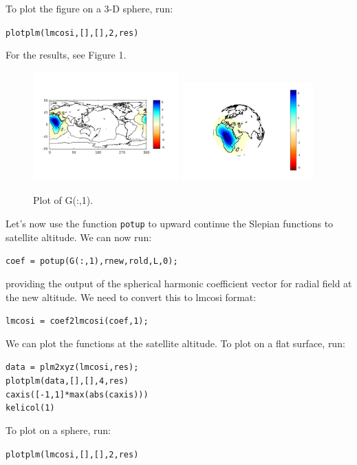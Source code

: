 \documentclass[11pt]{article}
\begin{document}
To plot the figure on a 3-D sphere, run:

\verb+plotplm(lmcosi,[],[],2,res)+

For the results, see Figure 1.
\begin{figure}[H]
  \includegraphics[width=0.5\textwidth]{figures/G(:,1)flatml.png}
  \includegraphics[width=0.45\textwidth]{figures/G(:,1)ml.png}
  \caption{Plot of G(:,1).}
\label{G(:,1)}
\end{figure}
Let's now use the function \verb+potup+ to upward continue the Slepian functions to satellite altitude.  We can now run:

\verb+coef = potup(G(:,1),rnew,rold,L,0);+

providing the output of the spherical harmonic coefficient vector for radial field at the new altitude.  We need to convert this to lmcosi format:

\verb+lmcosi = coef2lmcosi(coef,1);+

We can plot the functions at the satellite altitude.  To plot on a flat surface, run:

\verb+data = plm2xyz(lmcosi,res);+\\
\verb+plotplm(data,[],[],4,res)+\\
\verb+caxis([-1,1]*max(abs(caxis)))+\\
\verb+kelicol(1)+

To plot on a sphere, run:

\verb+plotplm(lmcosi,[],[],2,res)+
\end{document}
